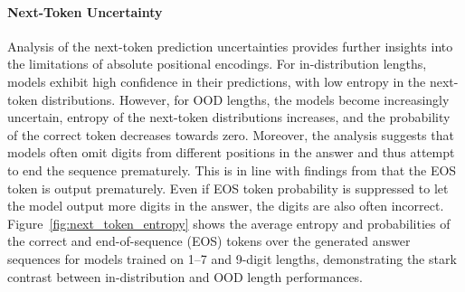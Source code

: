 \paragraph{Next-Token Uncertainty}
Analysis of the next-token prediction uncertainties provides further insights into the limitations of absolute positional encodings. For in-distribution lengths, models exhibit high confidence in their predictions, with low entropy in the next-token distributions. However, for OOD lengths, the models become increasingly uncertain, entropy of the next-token distributions increases, and the probability of the correct token decreases towards zero. Moreover, the analysis suggests that models often omit digits from different positions in the answer and thus attempt to end the sequence prematurely. This is in line with findings from \cite{newman_eos_2020} that the EOS token is output prematurely. Even if EOS token probability is suppressed to let the model output more digits in the answer, the digits are also often incorrect. Figure~\ref{fig:next_token_entropy} shows the average entropy and probabilities of the correct and end-of-sequence (EOS) tokens over the generated answer sequences for models trained on 1--7 and 9-digit lengths, demonstrating the stark contrast between in-distribution and OOD length performances.

